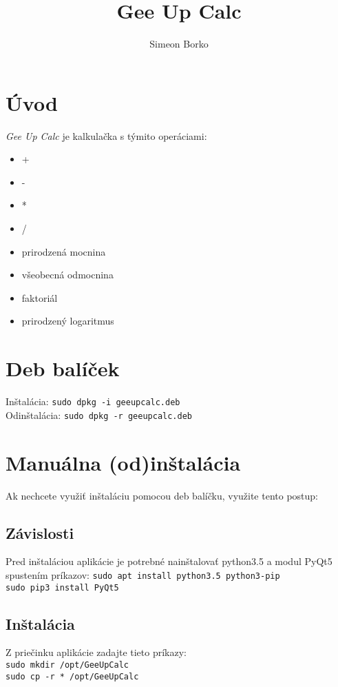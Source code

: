 \documentclass[12pt, a4paper]{article}
\title{Gee Up Calc}
\author{Simeon Borko}
\begin{document}
\maketitle

\section{Úvod}

\textit{Gee Up Calc} je kalkulačka s týmito operáciami:
\begin{itemize}
  \item +
  \item -
  \item *
  \item /
  \item prirodzená mocnina
  \item všeobecná odmocnina
  \item faktoriál
  \item prirodzený logaritmus
\end{itemize}

\section{Deb balíček}

Inštalácia: \texttt{sudo dpkg -i geeupcalc.deb} \\
Odinštalácia: \texttt{sudo dpkg -r geeupcalc.deb}

\section{Manuálna (od)inštalácia}
Ak nechcete využiť inštaláciu pomocou deb balíčku, využite tento postup:

\subsection{Závislosti}
Pred inštaláciou aplikácie je potrebné nainštalovať python3.5 a modul PyQt5 spustením príkazov:
\texttt{sudo apt install python3.5 python3-pip \\
sudo pip3 install PyQt5}

\subsection{Inštalácia}
Z priečinku aplikácie zadajte tieto príkazy: \\
\texttt{sudo mkdir /opt/GeeUpCalc \\
sudo cp -r * /opt/GeeUpCalc}
\end{document}

